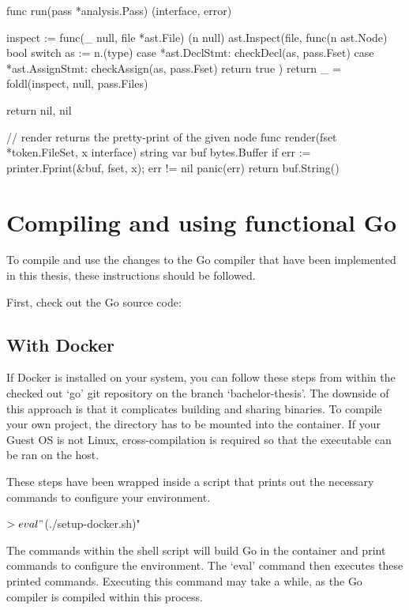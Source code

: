 \begin{code}
\begin{gocode}
func run(pass *analysis.Pass) (interface{}, error) {
	inspect := func(_ null, file *ast.File) (n null) {
		ast.Inspect(file, func(n ast.Node) bool {
			switch as := n.(type) {
			case *ast.DeclStmt:
				checkDecl(as, pass.Fset)
			case *ast.AssignStmt:
				checkAssign(as, pass.Fset)
			}
			return true
		})
		return
	}
	_ = foldl(inspect, null{}, pass.Files)

	return nil, nil
}

// render returns the pretty-print of the given node
func render(fset *token.FileSet, x interface{}) string {
	var buf bytes.Buffer
	if err := printer.Fprint(&buf, fset, x); err != nil {
		panic(err)
	}
	return buf.String()
}
	\end{gocode}
\end{code}

\section{Compiling and using functional Go}\label{appendix:install-fgo}

To compile and use the changes to the Go compiler that have been implemented in
this thesis, these instructions should be followed.

First, check out the Go source code:


\subsection{With Docker}

If Docker is installed on your system, you can follow these steps from within
the checked out `go' git repository on the branch `bachelor-thesis'.
The downside of this approach is that it complicates building and sharing binaries.
To compile your own project, the directory has to be mounted into the container.
If your Guest OS is not Linux, cross-compilation is required so that the executable
can be ran on the host.

These steps have been wrapped inside a script that prints out the necessary commands
to configure your environment.

\begin{bashcode}
$> eval "$(./setup-docker.sh)"
\end{bashcode}
The commands within the shell script will
build Go in the container and print commands to configure the environment. The `eval'
command then executes these printed commands. Executing this command may take a while,
as the Go compiler is compiled within this process.

